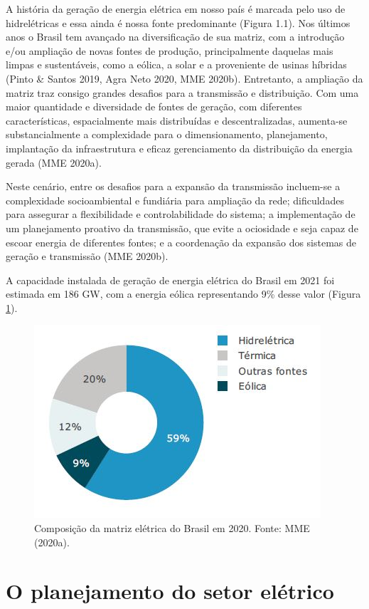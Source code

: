 \documentclass[
  oneside]{scrbook}
\begin{document}
A história da geração de energia elétrica em nosso país é marcada pelo uso de hidrelétricas e essa ainda é nossa fonte predominante (Figura 1.1). Nos últimos anos o Brasil tem avançado na diversificação de sua matriz, com a introdução e/ou ampliação de novas fontes de produção, principalmente daquelas mais limpas e sustentáveis, como a eólica, a solar e a proveniente de usinas híbridas (Pinto \& Santos 2019, Agra Neto 2020, MME 2020b). Entretanto, a ampliação da matriz traz consigo grandes desafios para a transmissão e distribuição. Com uma maior quantidade e diversidade de fontes de geração, com diferentes características, espacialmente mais distribuídas e descentralizadas, aumenta-se substancialmente a complexidade para o dimensionamento, planejamento, implantação da infraestrutura e eficaz gerenciamento da distribuição da energia gerada (MME 2020a).

Neste cenário, entre os desafios para a expansão da transmissão incluem-se a complexidade socioambiental e fundiária para ampliação da rede; dificuldades para assegurar a flexibilidade e controlabilidade do sistema; a implementação de um planejamento proativo da transmissão, que evite a ociosidade e seja capaz de escoar energia de diferentes fontes; e a coordenação da expansão dos sistemas de geração e transmissão (MME 2020b).

A capacidade instalada de geração de energia elétrica do Brasil em 2021 foi estimada em 186 GW, com a energia eólica representando 9\% desse valor (Figura \ref{fig:01}).

\begin{figure}[H]

{\centering \includegraphics[width=0.6\linewidth]{imagens/cap01/Figura_1.1} 

}

\caption{Composição da matriz elétrica do Brasil em 2020. Fonte: MME (2020a).}\label{fig:01}
\end{figure}

\hypertarget{o-planejamento-do-setor-eluxe9trico}{%
\section{O planejamento do setor elétrico}\label{o-planejamento-do-setor-eluxe9trico}}
\end{document}
